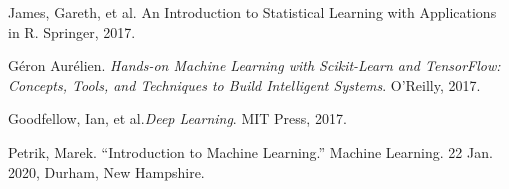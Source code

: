 \documentclass[12pt,letterpaper]{article}
\begin{document}

\begin{thebibliography}{9}


James, Gareth, et al. {An Introduction to Statistical Learning with Applications in R}. Springer, 2017.

Géron Aurélien. \textit{Hands-on Machine Learning with Scikit-Learn and TensorFlow: Concepts, Tools, and Techniques to Build Intelligent Systems}. O'Reilly, 2017.

Goodfellow, Ian, et al.\textit{Deep Learning}. MIT Press, 2017.

Petrik, Marek. “Introduction to Machine Learning.” Machine Learning. 22 Jan. 2020, Durham, New Hampshire.

\end{thebibliography}

\end{document}
